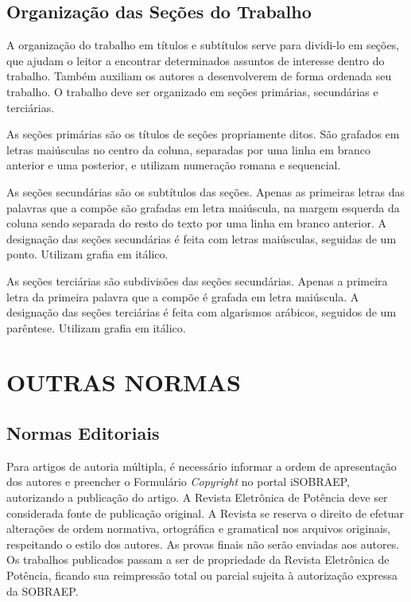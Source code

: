 \subsection{Organização das Seções do Trabalho}

A organização do trabalho em títulos e subtítulos serve para dividi-lo em seções, que ajudam o leitor a encontrar determinados assuntos de interesse dentro do trabalho. Também auxiliam os autores a desenvolverem de forma ordenada seu trabalho. O trabalho deve ser organizado em seções primárias, secundárias e terciárias.

As seções primárias são os títulos de seções propriamente ditos. São grafados em letras maiúsculas no centro da coluna, separadas por uma linha em branco anterior e uma posterior, e utilizam numeração romana e sequencial.

As seções secundárias são os subtítulos das seções. Apenas as primeiras letras das palavras que a compõe são grafadas em letra maiúscula, na margem esquerda da coluna sendo separada do resto do texto por uma linha em branco anterior. A designação das seções secundárias é feita com letras maiúsculas, seguidas de um ponto. Utilizam grafia em itálico.

As seções terciárias são subdivisões das seções secundárias. Apenas a primeira letra da primeira palavra que a compõe é grafada em letra maiúscula. A designação das seções terciárias é feita com algarismos arábicos, seguidos de um parêntese. Utilizam grafia em itálico.


\section{OUTRAS NORMAS}

\subsection{Normas Editoriais}

Para artigos de autoria múltipla, é necessário informar a ordem de apresentação dos autores e preencher o Formulário \textit{Copyright} no portal iSOBRAEP, autorizando a publicação do artigo. A Revista Eletrônica de Potência deve ser considerada fonte de publicação original. A Revista se reserva o direito de efetuar alterações de ordem normativa, ortográfica e gramatical nos arquivos originais, respeitando o estilo dos autores. As provas finais não serão enviadas aos autores. Os trabalhos publicados passam a ser de propriedade da Revista Eletrônica de Potência, ficando sua reimpressão total ou parcial sujeita à autorização expressa da SOBRAEP. 

